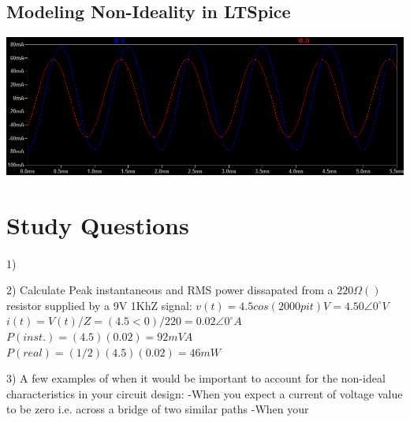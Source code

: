 \documentclass{article}
\begin{document}
\subsection*{Modeling Non-Ideality in LTSpice}
\includegraphics[width=\textwidth]{graph}

\section*{Study Questions}
\paragraph{}
1)

2) Calculate Peak instantaneous and RMS power dissapated from a $220\Omega()$ resistor supplied by a 9V 1KhZ signal:
$v(t) = 4.5cos(2000pi t) V = 4.50\angle{}0^\circ{} V$
$i(t) = V(t)/Z = (4.5<0)/220 = 0.02\angle{}0^\circ{} A$
$P(inst.) = (4.5)(0.02) = 92mVA$
$P(real) = (1/2)(4.5)(0.02) = 46mW$

3) A few examples of when it would be important to account for the non-ideal characteristics in your circuit design: 
    -When you expect a current of voltage value to be zero i.e. across a bridge of two similar paths
    -When your 
\end{document}
